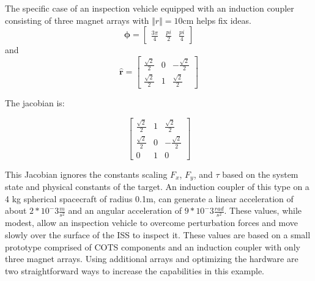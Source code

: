 \documentclass{article}
\begin{document}
The specific case of an inspection vehicle equipped with an induction coupler consisting of three magnet arrays with $\Vert r \Vert = 10 \text{cm}$ helps fix ideas.
\begin{equation}\label{eq:specificPhi}
\mathbf{\phi} = \begin{bmatrix} \frac{3\pi}{4}&\frac{pi}{2}&\frac{pi}{4}\end{bmatrix}
\end{equation}
and
\begin{equation}\label{eq:specificR}
\hat{\textbf{r}} = \begin{bmatrix} \frac{\sqrt{2}}{2} & 0 & -\frac{\sqrt{2}}{2} \\
\frac{\sqrt{2}}{2} & 1 & \frac{\sqrt{2}}{2}\end{bmatrix}
\end{equation}

The jacobian is: 

\begin{equation}\label{eq:specificJac}
\begin{bmatrix} \frac{\sqrt{2}}{2} & 1 & \frac{\sqrt{2}}{2} \\
\frac{\sqrt{2}}{2} & 0  & -\frac{\sqrt{2}}{2}
\\0  &  1 & 0 \end{bmatrix}
\end{equation}

This Jacobian ignores the constants scaling $ F_x $, $ F_y $, and‎ $\tau$‎ based on the system state and physical constants of the target.
An induction coupler of this type on a 4 kg spherical spacecraft of radius 0.1m, can generate a linear acceleration of about 
$2*10^-3 \frac{m}{s^2}$ 
and an angular acceleration of 
$9*10^-3 \frac{rad}{s^2}$. 
These values, while modest, allow an inspection vehicle to overcome perturbation forces and move slowly over the surface of the ISS to inspect it. These values are based on a small prototype comprised of COTS components and an induction coupler with only three magnet arrays. Using additional arrays and optimizing the hardware are two straightforward ways to increase the capabilities in this example.
\end{document}
